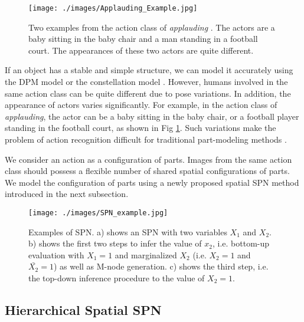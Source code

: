 \documentclass[journal]{IEEEtran}
\begin{document}
\begin{figure}[htb]
	\begin{center}
		\texttt{[image: ./images/Applauding\_Example.jpg]}
	\end{center}
	\caption{Two examples from the action class of \textit{applauding} \cite{Yao11humanaction__Stanford40}. The actors are a baby sitting in the baby chair and a man standing in a football court. The appearances of these two actors are quite different.}
	\label{fig:ApplaudingExample}
\end{figure}

If an object has a stable and simple structure, we can model it accurately using the DPM model \cite{DPM_Felzenszwalb:2010:ODD:1850486.1850574} or the constellation model \cite{CONStellation_model}. However, humans involved in the same action class can be quite different due to pose variations. In addition, the appearance of actors varies significantly. For example, in the action class of \textit{applauding}, the actor can be a baby sitting in the baby chair, or a football player standing in the football court, as shown in Fig \ref{fig:ApplaudingExample}. Such variations make the problem of action recognition difficult for traditional part-modeling methods \cite{CONStellation_model,DPM_Felzenszwalb:2010:ODD:1850486.1850574}.


We consider an action as a configuration of parts. Images from the same action class should possess a flexible number of shared spatial configurations of parts. We model the configuration of parts using a newly proposed spatial SPN method introduced in the next subsection. 


\begin{figure*}[htb]
	\begin{center}
		\texttt{[image: ./images/SPN\_example.jpg]}
	\end{center}
	\caption{Examples of SPN. a) shows an SPN with two variables $ X_1 $ and $ X_2 $. b) shows the first two steps to infer the value of $ x_2 $, i.e. bottom-up evaluation with $ X_1=1 $ and marginalized $ X_2 $ (i.e. $ X_2=1 $ and $ \bar{X_2}=1 $) as well as M-node generation. c) shows the third step, i.e. the top-down inference procedure to the value of $ X_2=1 $. }
	\label{fig:SPNExample}
\end{figure*}




\subsection{Hierarchical Spatial SPN}
\end{document}
